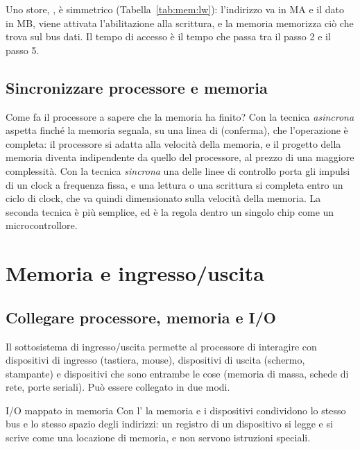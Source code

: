 Uno store, , è simmetrico (Tabella~\ref{tab:mem:lw}):
l'indirizzo va in MA e il dato in MB, viene attivata l'abilitazione alla
scrittura, e la memoria memorizza ciò che trova sul bus dati. Il tempo di
accesso è il tempo che passa tra il passo 2 e il passo 5.

\subsection{Sincronizzare processore e memoria}

Come fa il processore a sapere che la memoria ha finito? Con la tecnica
\emph{asincrona} aspetta finché la memoria segnala, su una linea di
 (conferma), che l'operazione è completa: il processore si
adatta alla velocità della memoria, e il progetto della memoria diventa
indipendente da quello del processore, al prezzo di una maggiore complessità.
Con la tecnica \emph{sincrona} una delle linee di controllo porta gli impulsi
di un clock a frequenza fissa, e una lettura o una scrittura si completa entro
un ciclo di clock, che va quindi dimensionato sulla velocità della memoria. La
seconda tecnica è più semplice, ed è la regola dentro un singolo chip come un
microcontrollore.

\section{Memoria e ingresso/uscita}

\subsection{Collegare processore, memoria e I/O}

Il sottosistema di ingresso/uscita permette al processore di interagire con
dispositivi di ingresso (tastiera, mouse), dispositivi di uscita (schermo,
stampante) e dispositivi che sono entrambe le cose (memoria di massa, schede di
rete, porte seriali). Può essere collegato in due modi.

\begin{definition}{I/O mappato in memoria}
Con l'  la memoria e i
dispositivi condividono lo stesso bus e lo stesso spazio degli indirizzi: un
registro di un dispositivo si legge e si scrive come una locazione di memoria,
e non servono istruzioni speciali.
\end{definition}

